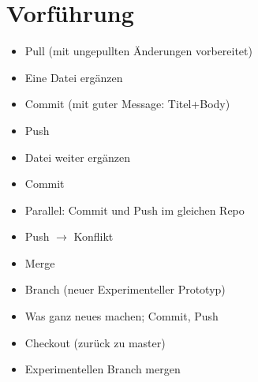 \section{Vorführung}
\begin{frame}
\tiny
\begin{itemize}
\item Pull (mit ungepullten Änderungen vorbereitet)
\item Eine Datei ergänzen
\item Commit (mit guter Message: Titel+Body)
\item Push
\item Datei weiter ergänzen
\item Commit
\item Parallel: Commit und Push im gleichen Repo
\item Push $\to$ Konflikt
\item Merge
\item Branch (neuer Experimenteller Prototyp)
\item Was ganz neues machen; Commit, Push
\item Checkout (zurück zu master)
\item Experimentellen Branch mergen
\end{itemize}
\end{frame}

